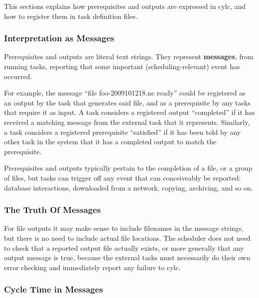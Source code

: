 \documentclass[11pt,a4paper]{article}
\begin{document}

This sections explains how prerequisites and outputs are expressed in
cylc, and how to register them in task definition files.

\label{sec:requisiteasmessage}
\subsubsection{Interpretation as Messages}

\begin{shaded}
    Prerequisites and outputs are literal text strings. They
    represent {\bf messages}, from running tasks, reporting that some
    important (scheduling-relevant) event has occurred.
\end{shaded}

For example, the message ``file foo-2009101218.nc ready'' could be
registered as an output by the task that generates said file, and as a
prerequisite by any tasks that require it as input.  A task considers a
registered output ``completed'' if it has received a matching message
from the external task that it represents.  Similarly, a task considers
a registered prerequisite ``satisfied'' if it has been told by any other
task in the system that it has a completed output to match the
prerequisite. 

Prerequisites and outputs typically pertain to the completion of a file,
or a group of files, but tasks can trigger off any event that can
conceiveably be reported: database interactions, downloaded from a
network, copying, archiving, and so on.

\subsubsection{The Truth Of Messages}

For file outputs it may make sense to include filenames in the message
strings, but there is no need to include actual file locations. The
scheduler does not need to check that a reported output file actually
exists, or more generally that any output message is true, because the
external tasks must necessarily do their own error checking and
immediately report any failure to cylc.



\subsubsection{Cycle Time in Messages}
\end{document}
